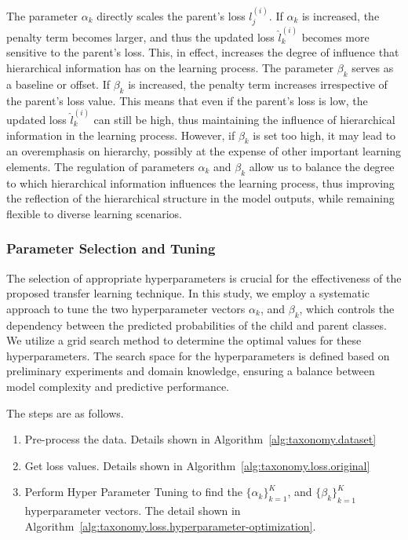 \documentclass[review,1p,times,numbers]{elsarticle}
\begin{document}
The parameter $\alpha _k$ directly scales the parent's loss $l_j^{(i)}$. If $\alpha _k$ is increased, the penalty term becomes larger, and thus the updated loss $\widehat{l}_k^{(i)}$ becomes more sensitive to the parent's loss. This, in effect, increases the degree of influence that hierarchical information has on the learning process. The parameter $\beta_k$ serves as a baseline or offset. If $\beta_k$ is increased, the penalty term increases irrespective of the parent's loss value. This means that even if the parent's loss is low, the updated loss $\widehat{l}_k^{(i)}$ can still be high, thus maintaining the influence of hierarchical information in the learning process. However, if $\beta_k$ is set too high, it may lead to an overemphasis on hierarchy, possibly at the expense of other important learning elements. The regulation of parameters $\alpha_k$ and $\beta_k$ allow us to balance the degree to which hierarchical information influences the learning process, thus improving the reflection of the hierarchical structure in the model outputs, while remaining flexible to diverse learning scenarios.

\subsubsection{Parameter Selection and Tuning}
The selection of appropriate hyperparameters is crucial for the effectiveness of the proposed transfer learning technique. In this study, we employ a systematic approach to tune the two hyperparameter vectors $\alpha_k $, and $\beta_k$, which controls the dependency between the predicted probabilities of the child and parent classes. We utilize a grid search method to determine the optimal values for these hyperparameters. The search space for the hyperparameters is defined based on preliminary experiments and domain knowledge, ensuring a balance between model complexity and predictive performance.

The steps are as follows.
\begin{enumerate}
    \item Pre-process the data. Details shown in Algorithm~\ref{alg:taxonomy.dataset}
    \item Get loss values. Details shown in Algorithm~\ref{alg:taxonomy.loss.original}
    \item Perform Hyper Parameter Tuning to find the ${\{\alpha_k \}}_{k=1}^K$, and ${\{\beta_k \}}_{k=1}^K$ hyperparameter vectors. The detail shown in Algorithm~\ref{alg:taxonomy.loss.hyperparameter-optimization}.
\end{enumerate}
\end{document}
